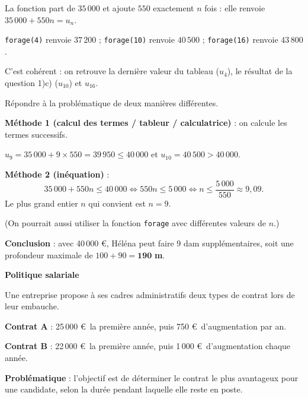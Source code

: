 \documentclass[12pt,a4paper]{book}
\begin{document}
\begin{enumMet}
	\begin{corrBox}
		La fonction part de $35\,000$ et ajoute $550$ exactement $n$ fois : elle renvoie $35\,000+550n=u_n$.

		\texttt{forage(4)} renvoie $37\,200$ ; \texttt{forage(10)} renvoie $40\,500$ ; \texttt{forage(16)} renvoie $43\,800$.

		C'est cohérent : on retrouve la dernière valeur du tableau ($u_4$), le résultat de la question 1)c) ($u_{10}$) et $u_{16}$.
	\end{corrBox}

	\item Répondre à la problématique de deux manières différentes.

	\begin{corrBox}
		\textbf{Méthode 1 (calcul des termes / tableur / calculatrice)} : on calcule les termes successifs.

		$u_9=35\,000+9\times 550=39\,950\leqslant 40\,000$ et $u_{10}=40\,500>40\,000$.

		\textbf{Méthode 2 (inéquation)} :
		\[35\,000+550n\leqslant 40\,000 \iff 550n\leqslant 5\,000 \iff n\leqslant \frac{5\,000}{550}\approx 9,09.\]
		Le plus grand entier $n$ qui convient est $n=9$.

		(On pourrait aussi utiliser la fonction \texttt{forage} avec différentes valeurs de $n$.)

		\textbf{Conclusion} : avec 40\,000 \euro, Héléna peut faire 9 dam supplémentaires, soit une profondeur maximale de $100+90=\mathbf{190}$ \textbf{m}.
	\end{corrBox}
\end{enumMet}

\exerciceDS{} \textbf{Politique salariale}

Une entreprise propose à ses cadres administratifs deux types de contrat lors de leur embauche.

\begin{itemMet}
	\item \textbf{Contrat A} : 25\,000 \euro\ la première année, puis 750 \euro\ d'augmentation par an.
	\item \textbf{Contrat B} : 22\,000 \euro\ la première année, puis 1\,000 \euro\ d'augmentation chaque année.
\end{itemMet}

\noindent\textbf{Problématique} : l'objectif est de déterminer le contrat le plus avantageux pour une candidate, selon la durée pendant laquelle elle reste en poste.
\end{document}
